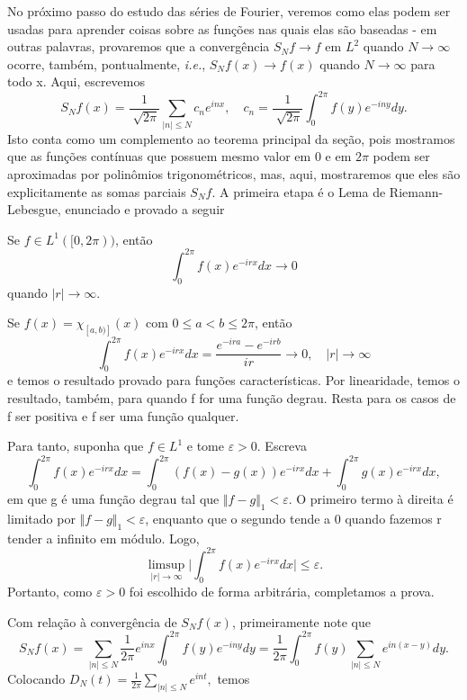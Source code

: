 \documentclass[measure_theory.tex]{subfiles}
\begin{document}
No próximo passo do estudo das séries de Fourier, veremos como elas podem ser usadas para aprender coisas sobre as funções nas quais elas são baseadas - em outras palavras, provaremos que
a convergência \(S_{N}f\to f\) em \(L^{2}\) quando \(N\to \infty\) ocorre, também, pontualmente, \textit{i.e.}, \(S_{N}f(x)\to f(x)\) quando \(N\to \infty\) para todo x. Aqui, escrevemos
\[
	S_{N}f(x) = \frac{1}{\sqrt[]{2\pi }}\sum\limits_{|n|\leq N}^{}c_{n}e^{inx},\quad c_{n} = \frac{1}{\sqrt[]{2\pi }}\int_{0}^{2\pi }f(y)e^{-iny}dy.
\]
Isto conta como um complemento ao teorema principal da seção, pois mostramos que as funções contínuas que possuem mesmo valor em 0 e em \(2\pi \) podem ser aproximadas por polinômios trigonométricos, mas, aqui, mostraremos que eles são explicitamente as somas parciais
\(S_{N}f\). A primeira etapa é o Lema de Riemann-Lebesgue, enunciado e provado a seguir
\hypertarget{riemann_lebesgue}{
	\begin{lemma*}
		Se \(f\in L^{1}([0, 2\pi ))\), então
		\[
			\int_{0}^{2\pi }f(x)e^{-irx}dx\to 0
		\]
		quando \(|r|\to \infty.\)
	\end{lemma*}}
\begin{proof*}
	Se \(f(x) = \chi_{[a, b)]}(x)\) com \(0 \leq a < b \leq 2\pi \), então
	\[
		\int_{0}^{2\pi }f(x)e^{-irx}dx = \frac{e^{-ira} - e^{-irb}}{ir}\to 0,\quad |r|\to \infty
	\]
	e temos o resultado provado para funções características. Por linearidade, temos o resultado, também, para quando f for uma função degrau.
	Resta para os casos de f ser positiva e f ser uma função qualquer.

	Para tanto, suponha que \(f\in L^{1} \) e tome \(\varepsilon > 0\). Escreva
	\[
		\int_{0}^{2\pi }f(x)e^{-irx}dx = \int_{0}^{2\pi }(f(x)-g(x))e^{-irx}dx + \int_{0}^{2\pi }g(x)e^{-irx}dx,
	\]
	em que g é uma função degrau tal que \(\Vert f-g \Vert_{1} < \varepsilon .\) O primeiro termo à direita é limitado por \(\Vert f - g \Vert_{1} < \varepsilon \), enquanto que o segundo tende a 0 quando fazemos r
	tender a infinito em módulo. Logo,
	\[
		\limsup_{|r|\to \infty}\biggl\vert \int_{0}^{2\pi }f(x)e^{-irx}dx \biggr\vert \leq \varepsilon .
	\]
	Portanto, como \(\varepsilon > 0\) foi escolhido de forma arbitrária, completamos a prova. \qedsymbol
\end{proof*}
Com relação à convergência de \(S_{N}f(x)\), primeiramente note que
\[
	S_{N}f(x) = \sum\limits_{|n|\leq N}^{}\frac{1}{2\pi }e^{inx}\int_{0}^{2\pi }f(y)e^{-iny}dy = \frac{1}{2\pi }\int_{0}^{2\pi }f(y)\sum\limits_{|n|\leq N}^{}e^{in(x-y)}dy.
\]
Colocando \(D_{N}(t) = \frac{1}{2\pi }\sum\limits_{|n|\leq N}^{}e^{int},\) temos
\end{document}
